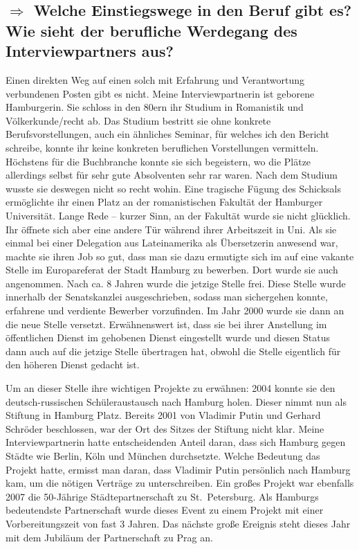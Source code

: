 \documentclass{../../sem_paper}
\newcommand\quest[1]{\subsection*{$\Rightarrow$ #1}}
\begin{document}
\quest{Welche Einstiegswege in den Beruf gibt es? Wie sieht der berufliche Werdegang des Interviewpartners aus?}
Einen direkten Weg auf einen solch mit Erfahrung und Verantwortung verbundenen Posten gibt es nicht.
Meine Interviewpartnerin ist geborene Hamburgerin. Sie schloss in den 80ern ihr Studium in Romanistik und Völkerkunde/recht ab. Das Studium bestritt sie ohne konkrete Berufsvorstellungen, auch ein ähnliches Seminar, für welches ich den Bericht schreibe, konnte ihr keine konkreten beruflichen Vorstellungen vermitteln. Höchstens für die Buchbranche konnte sie sich begeistern, wo die Plätze allerdings selbst für sehr gute Absolventen sehr rar waren. Nach dem Studium wusste sie deswegen nicht so recht wohin. Eine tragische Fügung des Schicksals ermöglichte ihr einen Platz an der romanistischen Fakultät der Hamburger Universität. Lange Rede -- kurzer Sinn, an der Fakultät wurde sie nicht glücklich. Ihr öffnete sich aber eine andere Tür während ihrer Arbeitszeit in Uni.
Als sie einmal bei einer Delegation aus Lateinamerika als Übersetzerin anwesend war, machte sie ihren Job so gut, dass man sie dazu ermutigte sich im auf eine vakante Stelle im Europareferat der Stadt Hamburg zu bewerben. Dort wurde sie auch angenommen.
Nach ca. 8 Jahren wurde die jetzige Stelle frei. Diese Stelle wurde innerhalb der Senatskanzlei ausgeschrieben, sodass man sichergehen konnte, erfahrene und verdiente Bewerber vorzufinden.
Im Jahr 2000 wurde sie dann an die neue Stelle versetzt. Erwähnenswert ist, dass sie bei ihrer Anstellung im öffentlichen Dienst im gehobenen Dienst eingestellt wurde und diesen Status dann auch auf die jetzige Stelle übertragen hat, obwohl die Stelle eigentlich für den höheren Dienst gedacht ist.

Um an dieser Stelle ihre wichtigen Projekte zu erwähnen:
2004 konnte sie den deutsch-russischen Schüleraustausch nach Hamburg holen. Dieser nimmt nun als Stiftung in Hamburg Platz. Bereits 2001 von Vladimir Putin und Gerhard Schröder beschlossen, war der Ort des Sitzes der Stiftung nicht klar. Meine Interviewpartnerin hatte entscheidenden Anteil daran, dass sich Hamburg gegen Städte wie Berlin, Köln und München durchsetzte. Welche Bedeutung das Projekt hatte, ermisst man daran, dass Vladimir Putin persönlich nach Hamburg kam, um die nötigen Verträge zu unterschreiben.
Ein großes Projekt war ebenfalls 2007 die 50-Jährige Städtepartnerschaft zu  St.\ Petersburg. Als Hamburgs bedeutendste Partnerschaft wurde dieses Event zu einem Projekt mit einer Vorbereitungszeit von fast 3 Jahren.
Das nächste große Ereignis steht dieses Jahr mit dem Jubiläum der Partnerschaft zu Prag an.
\end{document}
